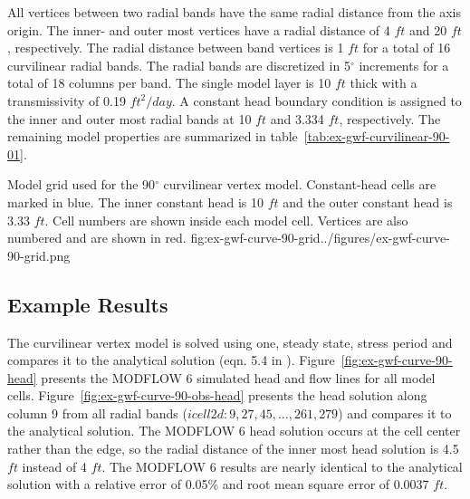 All vertices between two radial bands have the same radial distance from the axis origin. The inner- and outer most vertices have a radial distance of 4 $ft$ and 20 $ft$, respectively. The radial distance between band vertices is 1 $ft$ for a total of 16 curvilinear radial bands. The radial bands are discretized in 5$^{\circ}$ increments for a total of 18 columns per band. The single model layer is 10 $ft$ thick with a transmissivity of 0.19 $ft^2/day$. A constant head boundary condition is assigned to the inner and outer most radial bands at 10 $ft$ and 3.334 $ft$, respectively. The remaining model properties are summarized in table~\ref{tab:ex-gwf-curvilinear-90-01}.

\begin{StandardFigure}{
                                     Model grid used for the 90$^{\circ}$ curvilinear vertex model.
                                     Constant-head cells are marked in blue.
                                     The inner constant head is 10 $ft$ and the outer constant head is 3.33 $ft$.
                                     Cell numbers are shown inside each model cell.
                                     Vertices are also numbered and are shown in red.
                                     }{fig:ex-gwf-curve-90-grid}{../figures/ex-gwf-curve-90-grid.png}
\end{StandardFigure}




\subsection{Example Results}
The curvilinear vertex model is solved using one, steady state, stress period and compares it to the analytical solution (eqn. 5.4 in \cite{crank1975diffusion}). Figure~\ref{fig:ex-gwf-curve-90-head} presents the MODFLOW 6 simulated head and flow lines for all model cells. Figure~\ref{fig:ex-gwf-curve-90-obs-head} presents the head solution along column 9 from all radial bands ($icell2d\colon 9, 27, 45, \ldots, 261, 279$) and compares it to the analytical solution. The MODFLOW 6 head solution occurs at the cell center rather than the edge, so the radial distance of the inner most head solution is 4.5 $ft$ instead of 4 $ft$. The MODFLOW 6 results are nearly identical to the analytical solution with a relative error of 0.05\% and root mean square error of 0.0037 $ft$.

